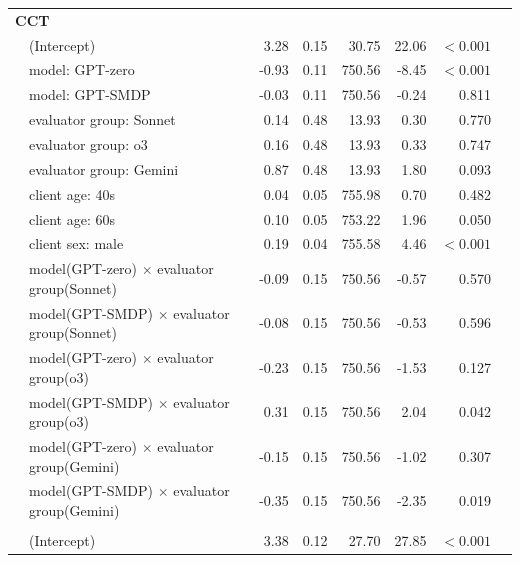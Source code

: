 \documentclass{wiley-article}
\begin{document}
{\begin{longtable}{@{}l p{} rrrrrr@{}}
      \multicolumn{7}{l}{\textbf{CCT}}\\
        & (Intercept)                                             &  3.28 & 0.15 &  30.75 &  22.06 & $<\!0.001$ \\
        & model: GPT-zero                                         & -0.93 & 0.11 & 750.56 &  -8.45 & $<\!0.001$ \\
        & model: GPT-SMDP                                         & -0.03 & 0.11 & 750.56 &  -0.24 & 0.811 \\
        & evaluator group: Sonnet                                 &  0.14 & 0.48 &  13.93 &   0.30 & 0.770 \\
        & evaluator group: o3                                     &  0.16 & 0.48 &  13.93 &   0.33 & 0.747 \\
        & evaluator group: Gemini                                 &  0.87 & 0.48 &  13.93 &   1.80 & 0.093 \\
        & client age: 40s                                         &  0.04 & 0.05 & 755.98 &   0.70 & 0.482 \\
        & client age: 60s                                         &  0.10 & 0.05 & 753.22 &   1.96 & 0.050 \\
        & client sex: male                                        &  0.19 & 0.04 & 755.58 &   4.46 & $<\!0.001$ \\
        & model(GPT-zero) $\times$ evaluator group(Sonnet)        & -0.09 & 0.15 & 750.56 &  -0.57 & 0.570 \\
        & model(GPT-SMDP) $\times$ evaluator group(Sonnet)        & -0.08 & 0.15 & 750.56 &  -0.53 & 0.596 \\
        & model(GPT-zero) $\times$ evaluator group(o3)            & -0.23 & 0.15 & 750.56 &  -1.53 & 0.127 \\
        & model(GPT-SMDP) $\times$ evaluator group(o3)            &  0.31 & 0.15 & 750.56 &   2.04 & 0.042 \\
        & model(GPT-zero) $\times$ evaluator group(Gemini)        & -0.15 & 0.15 & 750.56 &  -1.02 & 0.307 \\
        & model(GPT-SMDP) $\times$ evaluator group(Gemini)        & -0.35 & 0.15 & 750.56 &  -2.35 & 0.019 \\
      \addlinespace
      \multicolumn{7}{l}{\textbf{SST}}\\
        & (Intercept)                                             &  3.38 & 0.12 &  27.70 &  27.85 & $<\!0.001$ \\

\end{longtable}}
\end{document}
